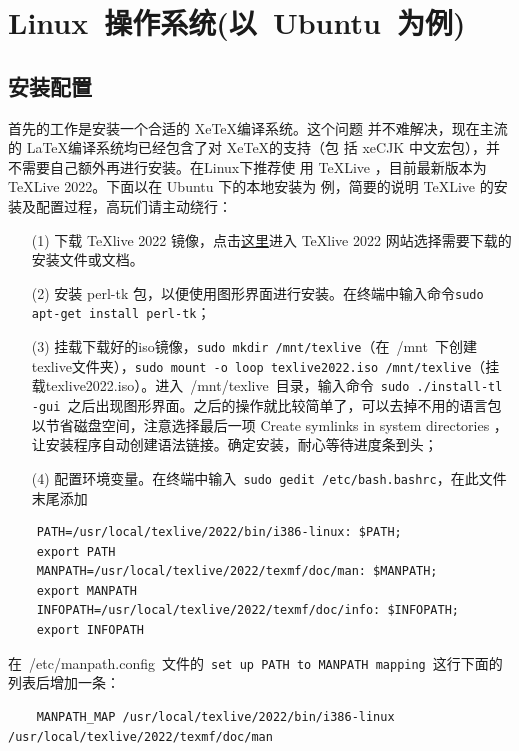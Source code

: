 \section{Linux~操作系统(以~Ubuntu~为例)}

\subsection{安装配置}

首先的工作是安装一个合适的 Xe\TeX{}编译系统。这个问题
并不难解决，现在主流的 \LaTeX{}编译系统均已经包含了对 Xe\TeX{}的支持（包
括 xeCJK 中文宏包），并不需要自己额外再进行安装。在Linux下推荐使
用 \TeX{}Live ，目前最新版本为 \TeX{}Live 2022。下面以在 Ubuntu 下的本地安装为
例，简要的说明 \TeX{}Live 的安装及配置过程，高玩们请主动绕行：

\begin{enumerate}
  \item[(1)] 下载 \TeX{}live 2022 镜像，点击\href{https://tug.org/texlive/}{这里}进入 \TeX{}live 2022 网站选择需要下载的安装文件或文档。
  \item[(2)] 安装 perl-tk 包，以便使用图形界面进行安装。在终端中输入命令\texttt{sudo apt-get install perl-tk}；
  \item[(3)] 挂载下载好的iso镜像，\texttt{sudo mkdir /mnt/texlive}（在~{/mnt}~下创建texlive文件夹），\texttt{sudo mount -o loop texlive2022.iso  /mnt/texlive}（挂载texlive2022.iso）。进入~/mnt/texlive~目录，输入命令~\texttt{sudo ./install-tl -gui}~之后出现图形界面。之后的操作就比较简单了，可以去掉不用的语言包以节省磁盘空间，注意选择最后一项 Create symlinks in system directories ，让安装程序自动创建语法链接。确定安装，耐心等待进度条到头；
  \item[(4)] 配置环境变量。在终端中输入~\texttt{sudo gedit /etc/bash.bashrc}，在此文件末尾添加
\end{enumerate}

\begin{lstlisting}
    PATH=/usr/local/texlive/2022/bin/i386-linux: $PATH;
    export PATH
    MANPATH=/usr/local/texlive/2022/texmf/doc/man: $MANPATH;
    export MANPATH
    INFOPATH=/usr/local/texlive/2022/texmf/doc/info: $INFOPATH;
    export INFOPATH
\end{lstlisting}

在~{/etc/manpath.config}~文件的~\texttt{set up PATH to  MANPATH mapping}~这行下面的列表后增加一条：

\begin{lstlisting}
    MANPATH_MAP /usr/local/texlive/2022/bin/i386-linux  /usr/local/texlive/2022/texmf/doc/man
\end{lstlisting}

